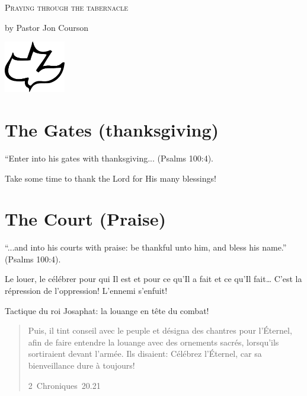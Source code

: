 \begin{center}
\mbox{}

\bigskip

\LARGE\textsc{Praying through the tabernacle}

\vspace{2ex plus \fill}

\large{by Pastor Jon Courson}

\vspace{3ex plus \fill}

\includegraphics[width=0.2\textwidth]{colombe.pdf}

\vspace{0ex plus \fill}


\mbox{}
\end{center}

\pagestyle{empty}
\setlength{\parindent}{0em}

\section{The Gates (thanksgiving)}

“Enter into his gates with thanksgiving... (Psalms 100:4).

Take some time to thank the Lord for His many blessings!  

 
\section{The Court (Praise)}

“...and into his courts with praise: be thankful unto him, and bless his name.” (Psalms 100:4).

Le louer, le célébrer pour qui Il est et pour ce qu'Il a fait et ce qu'Il fait\dots{} C'est la répression de l'oppression! L'ennemi s'enfuit!

Tactique du roi Josaphat:  la louange en tête du combat!

\begin{quote}
\og Puis, il tint conseil avec le peuple et désigna des chantres pour l’Éternel, afin de faire entendre la louange avec des ornements sacrés, lorsqu’ils sortiraient devant l’armée. Ils disaient: Célébrez l’Éternel, car sa bienveillance dure à toujours! \fg{}

\raggedleft\small 2~Chroniques~20.21
\end{quote}

